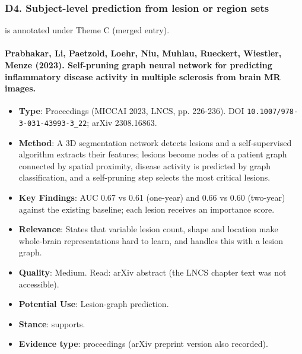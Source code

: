 \documentclass[journal,onecolumn]{IEEEtran}
\begin{document}
\subsubsection{D4. Subject-level prediction from lesion or region sets}

\cite{Chen2021AMINN} is annotated under Theme C (merged entry).

\paragraph{Prabhakar, Li, Paetzold, Loehr, Niu, Muhlau, Rueckert, Wiestler, Menze (2023). Self-pruning graph neural network for predicting inflammatory disease activity in multiple sclerosis from brain MR images.~\cite{Prabhakar2023Selfpruning}}\mbox{}

\begin{itemize}

\item{} \textbf{Type}: Proceedings (MICCAI 2023, LNCS, pp. 226-236). DOI \nolinkurl{10.1007/978-3-031-43993-3_22}; arXiv 2308.16863.

\item{} \textbf{Method}: A 3D segmentation network detects lesions and a self-supervised algorithm extracts their features; lesions become nodes of a patient graph connected by spatial proximity, disease activity is predicted by graph classification, and a self-pruning step selects the most critical lesions.

\item{} \textbf{Key Findings}: AUC 0.67 vs 0.61 (one-year) and 0.66 vs 0.60 (two-year) against the existing baseline; each lesion receives an importance score.

\item{} \textbf{Relevance}: States that variable lesion count, shape and location make whole-brain representations hard to learn, and handles this with a lesion graph.

\item{} \textbf{Quality}: Medium. Read: arXiv abstract (the LNCS chapter text was not accessible).

\item{} \textbf{Potential Use}: Lesion-graph prediction.

\item{} \textbf{Stance}: supports.

\item{} \textbf{Evidence type}: proceedings (arXiv preprint version also recorded).


\end{itemize}
\end{document}
